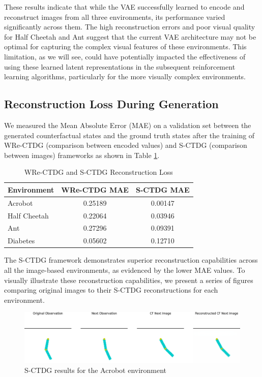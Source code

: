 These results indicate that while the VAE successfully learned to
encode and reconstruct images from all three environments,
its performance varied significantly across them. The high
reconstruction errors and poor visual quality for Half Cheetah
and Ant suggest that the current VAE architecture may not be
optimal for capturing the complex visual features of these environments.
This limitation, as we will see, could have potentially impacted the effectiveness
of using these learned latent representations in the subsequent reinforcement
learning algorithms, particularly for the more visually complex environments.

\subsection{Reconstruction Loss During Generation}

We measured the Mean Absolute Error (MAE) on a validation set
between the generated counterfactual states and the ground truth
states after the training of WRe-CTDG (comparison between encoded values)
and S-CTDG (comparison between images) frameworks
as shown in Table \ref{tab:mae}.

\begin{table}[h]
\centering
\begin{tabular}{@{}lcc@{}}
    \toprule
    \textbf{Environment} & \textbf{WRe-CTDG MAE} & \textbf{S-CTDG MAE} \\ \midrule
    Acrobot              & 0.25189               & 0.00147             \\
    Half Cheetah         & 0.22064               & 0.03946             \\
    Ant                  & 0.27296               & 0.09391             \\
    Diabetes             & 0.05602               & 0.12710             \\ \bottomrule
    \end{tabular}
\caption{WRe-CTDG and S-CTDG Reconstruction Loss}
\label{tab:mae}
\end{table}

The S-CTDG framework demonstrates superior reconstruction
capabilities across all the image-based environments,
as evidenced by the lower MAE values.
To visually illustrate these reconstruction capabilities, we present a
series of figures comparing original images to their S-CTDG reconstructions
for each environment.

\begin{figure}[h]
    \centering
    \includegraphics[width=\textwidth]{figures/ch5/e2e_acro.png}
    \caption{S-CTDG results for the Acrobot environment}
    \label{fig:acrobot_recon}
\end{figure}

